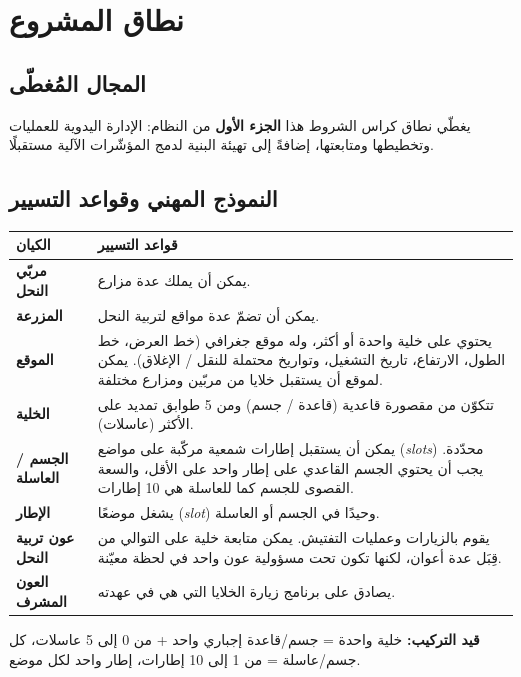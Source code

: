 \chapter{نطاق المشروع}

\section{المجال المُغطّى}
يغطّي نطاق كراس الشروط هذا \textbf{الجزء الأول} من النظام: الإدارة اليدوية
للعمليات وتخطيطها ومتابعتها، إضافةً إلى تهيئة البنية لدمج المؤشّرات الآلية
مستقبلًا.

\section{النموذج المهني وقواعد التسيير}
\begin{xltabular}{\textwidth}{>{\bfseries}p{3cm} X}
\toprule
\textbf{الكيان} & \textbf{قواعد التسيير} \\
\midrule
\endhead
مربّي النحل & يمكن أن يملك عدة مزارع. \\
المزرعة & يمكن أن تضمّ عدة مواقع لتربية النحل. \\
الموقع & يحتوي على خلية واحدة أو أكثر، وله موقع جغرافي (خط العرض، خط الطول، الارتفاع، تاريخ التشغيل، وتواريخ محتملة للنقل / الإغلاق). يمكن لموقع أن يستقبل خلايا من مربّين ومزارع مختلفة. \\
الخلية & تتكوّن من مقصورة قاعدية (قاعدة / جسم) ومن 5 طوابق تمديد على الأكثر (عاسلات). \\
الجسم / العاسلة & يمكن أن يستقبل إطارات شمعية مركّبة على مواضع (\emph{slots}) محدّدة. يجب أن يحتوي الجسم القاعدي على إطار واحد على الأقل، والسعة القصوى للجسم كما للعاسلة هي 10 إطارات. \\
الإطار & يشغل موضعًا (\emph{slot}) وحيدًا في الجسم أو العاسلة. \\
عون تربية النحل & يقوم بالزيارات وعمليات التفتيش. يمكن متابعة خلية على التوالي من قِبَل عدة أعوان، لكنها تكون تحت مسؤولية عون واحد في لحظة معيّنة. \\
العون المشرف & يصادق على برنامج زيارة الخلايا التي هي في عهدته. \\
\bottomrule
\end{xltabular}

\begin{encadre}[nobreak=true]
\textbf{قيد التركيب:} خلية واحدة = جسم/قاعدة إجباري واحد + من 0 إلى 5 عاسلات،
كل جسم/عاسلة = من 1 إلى 10 إطارات، إطار واحد لكل موضع.
\end{encadre}


